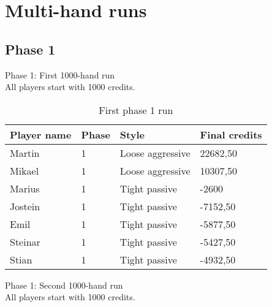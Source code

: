 \documentclass[a4paper, 12pt]{article}
\begin{document}
\section{Multi-hand runs}

\subsection{Phase 1}
\begin{center}
	{ \Large Phase 1: First 1000-hand run } \\
	All players start with 1000 credits.
\end{center}

\begin{table}[H]
	\begin{center}
		\begin{tabular}{|l|l|l| p{6cm} |}
		\hline
		\textbf{Player name} & \textbf{Phase} & \textbf{Style} & \textbf{Final credits} \\
		\hline
		Martin & 1 & Loose aggressive & 22682,50 \\
		\hline
		Mikael & 1 & Loose aggressive & 10307,50 \\
		\hline
		Marius & 1 & Tight passive & -2600 \\
		\hline
		Jostein & 1 & Tight passive & -7152,50 \\
		\hline
		Emil & 1 & Tight passive & -5877,50 \\
		\hline
		Steinar & 1 & Tight passive & -5427,50 \\
		\hline
		Stian & 1 & Tight passive & -4932,50 \\
		\hline
		\end{tabular}
	\end{center}
	\caption{First phase 1 run}
\end{table}

\begin{center}
	{ \Large Phase 1: Second 1000-hand run } \\
	All players start with 1000 credits.
\end{center}
\end{document}
